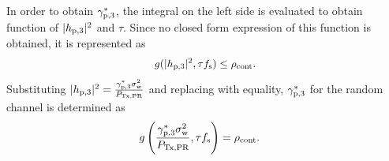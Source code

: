 {In order to obtain ${\gamma}_{\text{p,3}}^*$, the integral on the left side is evaluated to obtain function of $|h_{\text{p,3}}|^2$ and $\tau$. Since no closed form expression of this function is obtained, it is represented as}
\begin{align*}
g(|h_{\text{p,3}}|^2, \tau f_{\text{s}}) \le \rho_{\text{cont}}. \nonumber   
\end{align*}
{Substituting $|h_{\text{p,3}}|^2 = \frac{{\gamma}_{\text{p,3}}^* \sigma^2_{\text{w}}}{P_{\text{Tx,PR}}}$ and replacing with equality, ${\gamma}_{\text{p,3}}^*$ for the random channel is determined as} 
\begin{align*}
g\left(\frac{{\gamma}_{\text{p,3}}^* \sigma^2_{\text{w}}}{P_{\text{Tx,PR}}}, \tau f_{\text{s}}\right) &= \rho_{\text{cont}}. \nonumber  
\end{align*}
\begin{figure}[!ht]


\centering
{}
\end{figure}
